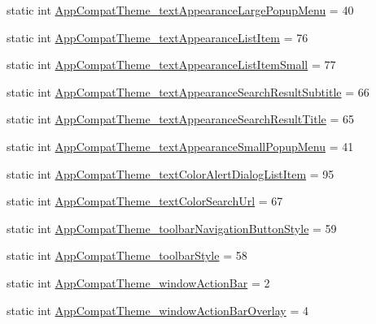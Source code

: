 \begin{DoxyCompactItemize}
\item 
static int \hyperlink{classandroid_1_1support_1_1v7_1_1appcompat_1_1R_1_1styleable_a8ecc7b52c9caba35359833cfc27874d8}{App\+Compat\+Theme\+\_\+text\+Appearance\+Large\+Popup\+Menu} = 40
\item 
static int \hyperlink{classandroid_1_1support_1_1v7_1_1appcompat_1_1R_1_1styleable_a59547599ad3f87d998f6508204f27aa1}{App\+Compat\+Theme\+\_\+text\+Appearance\+List\+Item} = 76
\item 
static int \hyperlink{classandroid_1_1support_1_1v7_1_1appcompat_1_1R_1_1styleable_a29f596f618045a5601a94a5dcc66946d}{App\+Compat\+Theme\+\_\+text\+Appearance\+List\+Item\+Small} = 77
\item 
static int \hyperlink{classandroid_1_1support_1_1v7_1_1appcompat_1_1R_1_1styleable_a797b49953c62db18a1dff0a607fc45b1}{App\+Compat\+Theme\+\_\+text\+Appearance\+Search\+Result\+Subtitle} = 66
\item 
static int \hyperlink{classandroid_1_1support_1_1v7_1_1appcompat_1_1R_1_1styleable_a9d65706b447bcd2a979584ec58b642f9}{App\+Compat\+Theme\+\_\+text\+Appearance\+Search\+Result\+Title} = 65
\item 
static int \hyperlink{classandroid_1_1support_1_1v7_1_1appcompat_1_1R_1_1styleable_a3954e911add56535f0dee6d29c451821}{App\+Compat\+Theme\+\_\+text\+Appearance\+Small\+Popup\+Menu} = 41
\item 
static int \hyperlink{classandroid_1_1support_1_1v7_1_1appcompat_1_1R_1_1styleable_a3c4e949776f711a5bd06b91184ceb404}{App\+Compat\+Theme\+\_\+text\+Color\+Alert\+Dialog\+List\+Item} = 95
\item 
static int \hyperlink{classandroid_1_1support_1_1v7_1_1appcompat_1_1R_1_1styleable_a2b9490f156d0cba539dc09a7aa3883e5}{App\+Compat\+Theme\+\_\+text\+Color\+Search\+Url} = 67
\item 
static int \hyperlink{classandroid_1_1support_1_1v7_1_1appcompat_1_1R_1_1styleable_ad578ce7888cd20c22c0f76c70ac3e899}{App\+Compat\+Theme\+\_\+toolbar\+Navigation\+Button\+Style} = 59
\item 
static int \hyperlink{classandroid_1_1support_1_1v7_1_1appcompat_1_1R_1_1styleable_a1e7ba103613221a76d37b259fde162e4}{App\+Compat\+Theme\+\_\+toolbar\+Style} = 58
\item 
static int \hyperlink{classandroid_1_1support_1_1v7_1_1appcompat_1_1R_1_1styleable_a9ed69fb61097add24dccaf9f82bbd746}{App\+Compat\+Theme\+\_\+window\+Action\+Bar} = 2
\item 
static int \hyperlink{classandroid_1_1support_1_1v7_1_1appcompat_1_1R_1_1styleable_aabf99bfa0bdf029240c1024f81c0475d}{App\+Compat\+Theme\+\_\+window\+Action\+Bar\+Overlay} = 4

\end{DoxyCompactItemize}
